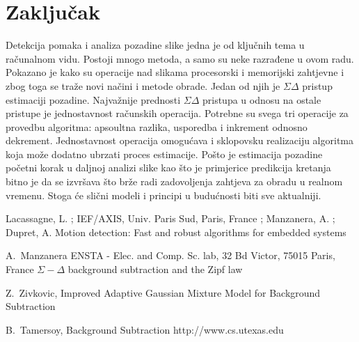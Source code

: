 \documentclass[a4paper,twocolumn]{article}
\begin{document}
\section{Zaključak}

Detekcija pomaka i analiza pozadine slike jedna je od ključnih tema u računalnom
vidu. Postoji mnogo metoda, a samo su neke razrađene u ovom radu. Pokazano je
kako su operacije nad slikama procesorski i memorijski zahtjevne i zbog toga se
traže novi načini i metode obrade. Jedan od njih je \(\Sigma\Delta\) pristup
estimaciji pozadine. Najvažnije prednosti \(\Sigma\Delta\) pristupa u odnosu
na ostale pristupe je jednostavnost računskih operacija. Potrebne su svega
tri operacije za provedbu algoritma: apsoultna razlika, usporedba i inkrement
odnosno dekrement. Jednostavnost operacija omogućava i sklopovsku realizaciju
algoritma koja može dodatno ubrzati proces estimacije. Pošto je estimacija
pozadine početni korak u daljnoj analizi slike kao što je primjerice predikcija
kretanja bitno je da se izvršava što brže radi zadovoljenja zahtjeva za obradu
u realnom vremenu. Stoga će slični modeli i principi u budućnosti biti sve
aktualniji.


\begin{thebibliography}{25}

Lacassagne, L. ; IEF/AXIS, Univ. Paris Sud, Paris, France ; Manzanera, A. ;
Dupret, A.
Motion detection: Fast and robust algorithms for embedded systems

A.~Manzanera ENSTA - Elec. and Comp. Sc. lab, 32 Bd Victor, 75015 Paris, France
\(\Sigma-\Delta\) background subtraction and the Zipf law

Z.~Zivkovic,
Improved Adaptive Gaussian Mixture Model for Background Subtraction

B.~Tamersoy,
Background Subtraction
http://www.cs.utexas.edu

\end{thebibliography}
\end{document}
